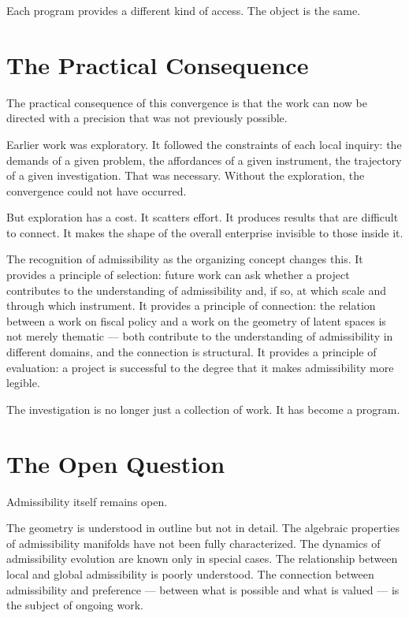 \documentclass[12pt, openany]{book}
\begin{document}
Each program provides a different kind of access. The object is the same.

\section{The Practical Consequence}

The practical consequence of this convergence is that the work can now
be directed with a precision that was not previously possible.

Earlier work was exploratory. It followed the constraints of each local
inquiry: the demands of a given problem, the affordances of a given
instrument, the trajectory of a given investigation. That was necessary.
Without the exploration, the convergence could not have occurred.

But exploration has a cost. It scatters effort. It produces results that
are difficult to connect. It makes the shape of the overall enterprise
invisible to those inside it.

The recognition of admissibility as the organizing concept changes this.
It provides a principle of selection: future work can ask whether a project
contributes to the understanding of admissibility and, if so, at which
scale and through which instrument. It provides a principle of connection:
the relation between a work on fiscal policy and a work on the geometry of
latent spaces is not merely thematic — both contribute to the understanding
of admissibility in different domains, and the connection is structural.
It provides a principle of evaluation: a project is successful to the
degree that it makes admissibility more legible.

The investigation is no longer just a collection of work. It has become
a program.

\section{The Open Question}

Admissibility itself remains open.

The geometry is understood in outline but not in detail. The algebraic
properties of admissibility manifolds have not been fully characterized.
The dynamics of admissibility evolution are known only in special cases.
The relationship between local and global admissibility is poorly
understood. The connection between admissibility and preference — between
what is possible and what is valued — is the subject of ongoing work.
\end{document}
